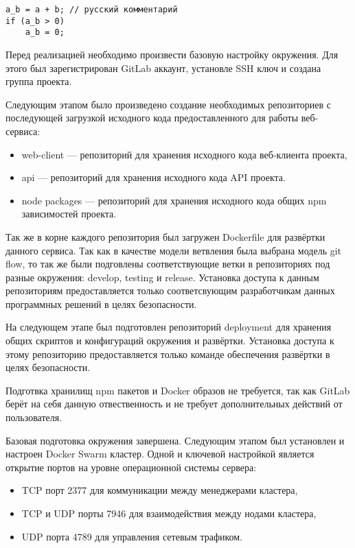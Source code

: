 \begin{verbatim}
a_b = a + b; // русский комментарий
if (a_b > 0)
    a_b = 0;
\end{verbatim}

Перед реализацией необходимо произвести базовую настройку окружения.
Для этого был зарегистрирован GitLab аккаунт, установле SSH ключ и создана группа проекта.

Следующим этапом было произведено создание необходимых репозиториев с последующей загрузкой исходного кода предоставленного для работы веб-сервиса:

\begin{itemize}
    \item web-client --- репозиторий для хранения исходного кода веб-клиента проекта,
    \item api --- репозиторий для хранения исходного кода API проекта.
    \item node packages --- репозиторий для хранения исходного кода общих npm зависимостей проекта.
\end{itemize}

Так же в корне каждого репозитория был загружен Dockerfile для развёртки данного сервиса.
Так как в качестве модели ветвления была выбрана модель git flow, то так же были подговлены соответствующие ветки в репозиториях под разные окружения: develop, testing и release.
Установка доступа к данным репозиториям предоставляется только соответсвующим разработчикам данных программных решений в целях безопасности.

На следующем этапе был подготовлен репозиторий deployment для хранения общих скриптов и конфигураций окружения и развёртки.
Установка доступа к этому репозиторию предоставляется только команде обеспечения развёртки в целях безопасности.

Подготвка хранилищ npm пакетов и Docker образов не требуется, так как GitLab берёт на себя данную отвественность и не требует дополнительных действий от пользователя.

Базовая подготовка окружения завершена.
Следующим этапом был установлен и настроен Docker Swarm кластер.
Одной и ключевой настройкой является открытие портов на уровне операционной системы сервера:

\begin{itemize}
    \item TCP порт 2377 для коммуникации между менеджерами кластера,
    \item TCP и UDP порты 7946 для взаимодействия между нодами кластера,
    \item UDP порта 4789 для управления сетевым трафиком.
\end{itemize}

